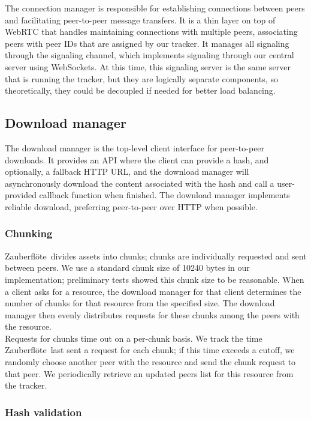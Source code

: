 \documentclass[letterpaper,twocolumn,10pt]{article}
\newcommand{\zbf}{Zauberfl\"{o}te}
\begin{document}
The connection manager is responsible for establishing connections between
peers and facilitating peer-to-peer message transfers. It is a thin layer on
top of WebRTC that handles maintaining connections with multiple peers,
associating peers with peer IDs that are assigned by our tracker. It manages
all signaling through the signaling channel, which implements signaling through
our central server using WebSockets. At this time, this signaling server is the
same server that is running the tracker, but they are logically separate
components, so theoretically, they could be decoupled if needed for better load
balancing.

\subsection{Download manager}

The download manager is the top-level client interface for peer-to-peer
downloads. It provides an API where the client can provide a hash, and
optionally, a fallback HTTP URL, and the download manager will asynchronously
download the content associated with the hash and call a user-provided callback
function when finished. The download manager implements reliable download,
preferring peer-to-peer over HTTP when possible.

\subsubsection{Chunking}

\zbf\ divides assets into chunks; chunks are individually requested and sent between peers. We use a standard chunk size of 10240 bytes in our implementation; preliminary tests showed this chunk size to be reasonable. When a client asks for a resource, the download manager for that client determines the number of chunks for that resource from the specified size. The download manager then evenly distributes requests for these chunks among the peers with the resource. \\
Requests for chunks time out on a per-chunk basis. We track the time \zbf\ last sent a request for each chunk; if this time exceeds a cutoff, we randomly choose another peer with the resource and send the chunk request to that peer. We periodically retrieve an updated peers list for this resource from the tracker. 

\subsubsection{Hash validation}
\end{document}
